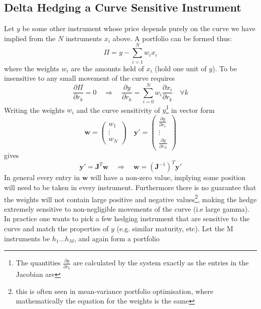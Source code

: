 \subsection{Delta Hedging a Curve Sensitive Instrument}
Let $y$ be some other instrument whose price depends purely on the curve we have implied from the $N$ instruments $x_i$ above. A portfolio can be formed thus:
%
\begin{equation}
\Pi = y-\sum^N_{i=1}w_ix_i
\end{equation}
%
where the weights $w_i$ are the amounts held of $x_i$ (hold one unit of $y$). To be insensitive to any small movement of the curve requires 
%
\begin{equation}
\frac{\partial \Pi}{\partial r_k}=0 \quad \Rightarrow \quad  \frac{\partial y}{\partial r_k} =\sum^N_{i=0}w_i\frac{\partial x_i}{\partial r_k} \quad \forall k
\end{equation}
%
Writing the weights $w_i$ and the curve sensitivity of $y$\footnote{The quantities $ \frac{\partial y}{\partial r_k}$ are calculated by the system exactly as the entries in the Jacobian are} in  vector form 
\begin{equation}
\mathbf{w} = \left(  
\begin{array}{c}
w_1\\
\vdots\\
w_N
\end{array}
\right)
\quad
\mathbf{y}' = \left(  
\begin{array}{c}
\frac{\partial y}{\partial r_1 }\\
\vdots\\
\frac{\partial y}{\partial r_N}
\end{array}
\right)
\end{equation}
%
gives 
\begin{equation}
\mathbf{y}'=\mathbf{J}^T\mathbf{w} \quad \Rightarrow \quad \mathbf{w} =\left( \mathbf{J}^{-1}\right)^T\mathbf{y}'
\end{equation}
%
In general every entry in $\mathbf{w}$ will have a non-zero value, implying some position will need to be taken in every instrument. Furthermore there is no guarantee that the weights will not contain large positive and negative values\footnote{this is often seen in mean-variance portfolio optimisation, where mathematically the equation for the weights is the same}, making the hedge extremely sensitive to non-negligible movements of the curve (i.e large gamma).
In practice one wants to pick a few hedging instrument that are sensitive to the curve and match the properties of $y$ (e.g. similar maturity, etc). Let the M instruments be $h_1\ldots h_M$, and again form a portfolio 
